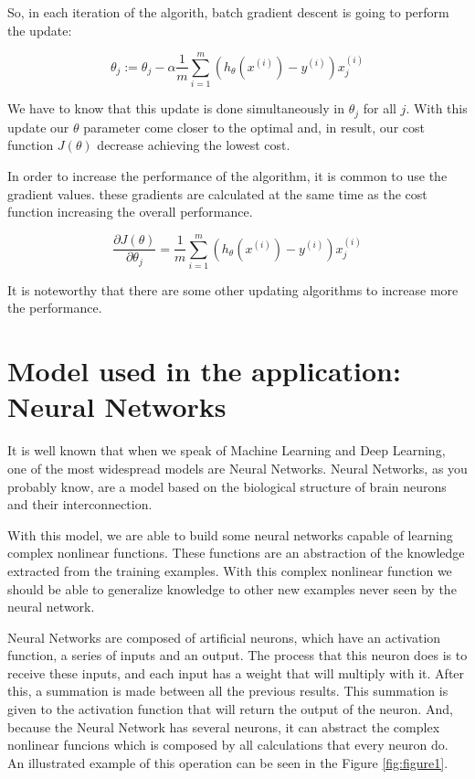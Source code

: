 \documentclass[12pt]{article}
\begin{document}
So, in each iteration of the algorith, batch gradient descent is going to perform the update:

 \begin{equation}
 \theta_{j}:= \theta_{j} - \alpha \frac{1}{m} \displaystyle\sum_{i=1}^{m} (h_{\theta}(x^{(i)})-y^{(i)})x_{j}^{(i)}
\end{equation}

We have to know that this update is done simultaneously in $\theta_{j}$ for all $j$. With this update our $\theta$ parameter come closer to the optimal and, in result, our cost function $J(\theta)$ decrease achieving the lowest cost.

In order to increase the performance of the algorithm, it is common to use the gradient values. these gradients are calculated at the same time as the cost function increasing the overall performance.

\begin{equation}
 \frac{\partial J(\theta)}{\partial\theta_{j}}= \frac{1}{m} \displaystyle\sum_{i=1}^{m} (h_{\theta}(x^{(i)})-y^{(i)})x_{j}^{(i)}
\end{equation}

It is noteworthy that there are some other updating algorithms to increase more the performance.
\section{Model used in the application: Neural Networks} \label{sec:Neural Networks}
It is well known that when we speak of Machine Learning and Deep Learning, one of the most widespread models are Neural Networks. Neural Networks, as you probably know, are a model based on the biological structure of brain neurons and their interconnection.

With this model, we are able to build some neural networks capable of learning complex nonlinear functions. These functions are an abstraction of the knowledge extracted from the training examples. With this complex nonlinear function we should be able to generalize knowledge to other new examples never seen by the neural network.

Neural Networks are composed of artificial neurons, which have an activation function, a series of inputs and an output. The process that this neuron does is to receive these inputs, and each input has a weight that will multiply with it. After this, a summation is made between all the previous results. This summation is given to the activation function that will return the output of the neuron. And, because the Neural Network has several neurons, it can abstract the complex nonlinear funcions which is composed by all calculations that every neuron do. An illustrated example of this operation can be seen in the Figure \ref{fig:figure1}.
\end{document}
